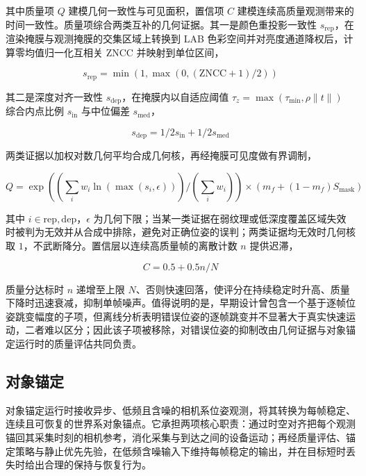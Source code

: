 \documentclass[review]{vgtc}
\begin{document}
其中质量项 $Q$ 建模几何一致性与可见面积，置信项 $C$ 建模连续高质量观测带来的时间一致性。质量项综合两类互补的几何证据。其一是颜色重投影一致性 $s_{\mathrm{rep}}$，在渲染掩膜与观测掩膜的交集区域上转换到 LAB 色彩空间并对亮度通道降权后，计算零均值归一化互相关 $\mathrm{ZNCC}$ 并映射到单位区间，

\begin{equation}
s_{\mathrm{rep}} = \min\!\left(1, \max\!\left(0, (\mathrm{ZNCC} + 1) / 2\right)\right)
\label{eq:reproj}
\end{equation}


其二是深度对齐一致性 $s_{\mathrm{dep}}$，在掩膜内以自适应阈值 $\tau_z = \max\!\left(\tau_{\mathrm{min}}, \rho \lVert t \rVert\right)$ 综合内点比例 $s_{\mathrm{in}}$ 与中位偏差 $s_{\mathrm{med}}$，

\begin{equation}
s_{\mathrm{dep}} = 1 / 2 s_{\mathrm{in}} + 1 / 2 s_{\mathrm{med}}
\label{eq:depthalign}
\end{equation}


两类证据以加权对数几何平均合成几何核，再经掩膜可见度做有界调制，

\begin{equation}
Q = \exp\!\left((\sum_i w_i \ln(\max\!\left(s_i, \epsilon\right))) / (\sum_i w_i)\right) \times (m_f + (1 - m_f) S_{\mathrm{mask}})
\label{eq:quality}
\end{equation}


其中 $i \in {\mathrm{rep}, \mathrm{dep}}$，$\epsilon$ 为几何下限；当某一类证据在弱纹理或低深度覆盖区域失效时被判为无效并从合成中排除，避免对正确位姿的误判；两类证据均无效时几何核取 $1$，不武断降分。置信层以连续高质量帧的离散计数 $n$ 提供迟滞，

\begin{equation}
C = 0.5 + 0.5 n / N
\label{eq:confidence}
\end{equation}


质量分达标时 $n$ 递增至上限 $N$、否则快速回落，使评分在持续稳定时升高、质量下降时迅速衰减，抑制单帧噪声。值得说明的是，早期设计曾包含一个基于逐帧位姿跳变幅度的子项，但离线分析表明错误位姿的逐帧跳变并不显著大于真实快速运动，二者难以区分；因此该子项被移除，对错误位姿的抑制改由几何证据与对象锚定运行时的质量评估共同负责。

\subsection{对象锚定}\label{sec:anchoring}


对象锚定运行时接收异步、低频且含噪的相机系位姿观测，将其转换为每帧稳定、连续且可恢复的世界系对象锚点。它承担两项核心职责：通过时空对齐把每个观测锚回其采集时刻的相机参考，消化采集与到达之间的设备运动；再经质量评估、锚定策略与静止优先先验，在低频含噪输入下维持每帧稳定的输出，并在目标短时丢失时给出合理的保持与恢复行为。
\end{document}
